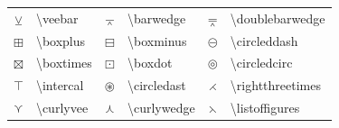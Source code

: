 \documentclass[a4paper]{ctexart}
\begin{document}
\begin{table}[H]
\begin{tabular}{clclcl}
            $\veebar$           & \textbackslash veebar         & $\barwedge$       & \textbackslash barwedge           &
            $\doublebarwedge$   & \textbackslash doublebarwedge                                                         \\
            $\boxplus$          & \textbackslash boxplus        & $\boxminus$       & \textbackslash boxminus           &
            $\circleddash$      & \textbackslash circleddash                                                            \\
            $\boxtimes$         & \textbackslash boxtimes       & $\boxdot$         & \textbackslash boxdot             &
            $\circledcirc$      & \textbackslash circledcirc                                                            \\
            $\intercal$         & \textbackslash intercal       & $\circledast$     & \textbackslash circledast         &
            $\rightthreetimes$  & \textbackslash rightthreetimes                                                        \\
            $\curlyvee$         & \textbackslash curlyvee       & $\curlywedge$     & \textbackslash curlywedge         &
            $\leftthreetimes$   & \textbackslash listoffigures                                                          \\
            \bottomrule
        \end{tabular}
    \end{table}
\end{document}

